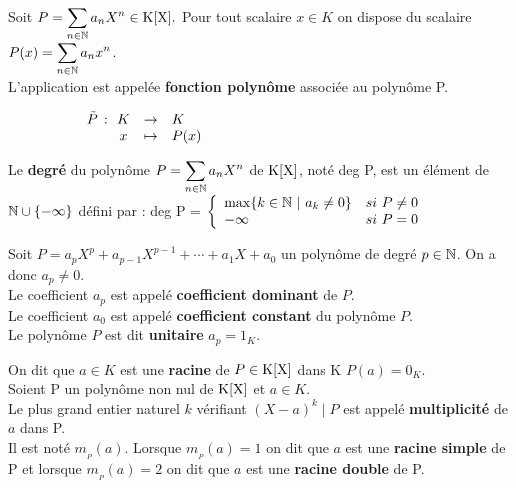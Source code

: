 \noindent Soit \(\displaystyle P=\sum_{n\in \mathbb{N}}a_nX^n\in \text{K}[\text{X}]. \) Pour tout scalaire \(x\in K\) on dispose du scalaire \(\displaystyle P(x)=\sum_{n\in \mathbb{N}}a_nx^n\).\vspace{0.2cm}\\
L'application \hspace{3.3cm} est appelée \textbf{fonction polynôme} associée au polynôme P.

\vspace{-0.45cm}

\(\begin{array}{rccl}
    \hspace{1.8cm} \Tilde{P}\, : &\!\! K & \to & K \\
     &\!\! x & \mapsto & P(x) 
\end{array}
\)

\vspace{1.5cm}

Le \textbf{degré} du polynôme \(\displaystyle P = \sum _{n\in \mathbb{N}}a_nX^n \) de $\text{K}[\text{X}]$, noté deg P, est un élément de \(\mathbb{N}\cup \{-\infty\}\) défini par : deg P = \(\left\{ \begin{array}{lc}
     \max \{ k\in \mathbb{N} \ | \ a_k \neq 0 \} & si\ P\neq 0 \\
     -\infty & si\ P= 0
\end{array} \right.\) 

\vspace{1cm}

Soit \(P=a_pX^p+a_{p-1}X^{p-1}+\cdots+a_1X+a_0  \) un polynôme de degré \(p\in \mathbb{N}\). On a donc \(a_p\neq 0\).\vspace{0.1cm}\\
Le coefficient \(a_p\) est appelé \textbf{coefficient dominant} de \(P\).\\
Le coefficient \(a_0\) est appelé \textbf{coefficient constant} du polynôme \(P\).\vspace{0.1cm}\\
Le polynôme \(P\) est dit \textbf{unitaire} \ssi \(a_p=1_K\).

\vspace{1cm}

\noindent On dit que \(a\in K\) est une \textbf{racine} de \(P\in \text{K}[\text{X}]\) dans K \ssi \(P(a)=0_K.\) \vspace{0.5cm}\\
Soient P un polynôme non nul de $\text{K}[\text{X}]$ et \(a\in K.\)\vspace{0.1cm}\\
Le plus grand entier naturel $k$ vérifiant \((X-a)^k\mid P\) est appelé \textbf{multiplicité} de \(a\) dans P.\\
Il est noté \(m_{_P}(a)\). Lorsque \(m_{_P}(a)=1\) on dit que \(a\) est une \textbf{racine simple} de P et lorsque \(m_{_P}(a)=2\) on dit que \(a\) est une \textbf{racine double} de P. 


